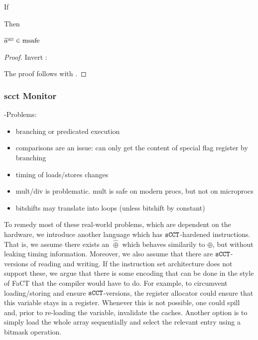\begin{lemma}\label{lem:mssafe-tracems}
  If
  Then
  \begin{goals}
    \item $\overline{a^{\text{\tiny ms}}}\in\operatorname{msafe}$
  \end{goals}
\end{lemma}
\begin{proof}
  Invert :
  The proof follows with .
\end{proof}

\subsubsection{\gls*{scct} Monitor}
\sCCT-Problems:
\begin{itemize}
  \item branching or predicated execution
  \item comparisons are an issue: can only get the content of special flag register by branching
  \item timing of loads/stores changes
  \item mult/div is problematic. mult is safe on modern procs, but not on microprocs
  \item bitshifts may translate into loops (unless bitshift by constant)
\end{itemize}

To remedy most of these real-world problems, which are dependent on the hardware, we introduce another language which has $\texttt{sCCT}$-hardened instructions.
That is, we assume there exists an $\hat{\oplus}$ which behaves similarily to $\oplus$, but without leaking timing information.
Moreover, we also assume that there are $\texttt{sCCT}$-versions of reading and writing.
If the instruction set architecture does not support these, we argue that there is some encoding that can be done in the style of FaCT that the compiler would have to do.
For example, to circumvent loading/storing and ensure $\texttt{sCCT}$-versions, the register allocator could ensure that this variable stays in a register. Whenever this is not possible, one could spill and, prior to re-loading the variable, invalidate the caches. Another option is to simply load the whole array sequentially and select the relevant entry using a bitmask operation.

